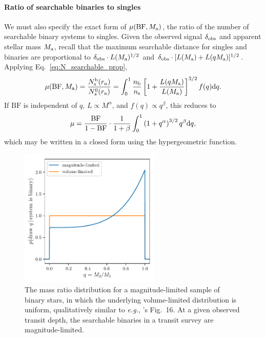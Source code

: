 \documentclass[12pt,modern]{aastex61}
\renewcommand{\a}{_{\rm a}}
\newcommand{\s}{_{\rm s}}
\begin{document}
\paragraph{Ratio of searchable binaries to singles}
We must also specify the exact form of $\mu({\rm BF},M\a)$, the ratio of 
the number of searchable binary systems to singles.
Given the observed signal $\delta_{\rm obs}$ and apparent stellar mass $M\a$, 
recall that the maximum searchable distance for singles and binaries are 
proportional to $\delta_{\rm obs}\cdot L(M\a)^{1/2}$ and $\delta_{\rm 
obs}\cdot [L(M\a)+L(qM\a)]^{1/2}$.
Applying Eq.~\ref{eq:N_searchable_prop},
\begin{equation}
\mu({\rm BF},M\a) = 
\frac{N\s^{\rm b}(r_a)}{N_s^0(r\a)}=
\int_0^1 {n_{\rm b}\over n_{\rm s}}\left[1+{L(qM\a) \over L(M\a)}\right]^{3/2} 
f(q)\mathrm{d}q.
\label{eq:mu_general}
\end{equation}
If $\mathrm{BF}$ is independent of $q$, $L \propto M^\alpha$, and $f(q) 
\propto q^\beta$, this reduces to
\begin{equation}
\mu =\frac{{\rm BF}}{1 - {\rm BF}}\cdot {1\over{1+\beta}}\int_0^1 
\left(1+q^\alpha\right)^{3/2} q^\beta\mathrm{d}q,
\label{eq:mu_power_laws}
\end{equation}
which may be written in a closed form using the hypergeometric function.

\begin{figure}[!tb]
    \centering
    \includegraphics[width=0.6\textwidth]{figures/mass_ratio_distribution.pdf}
    \caption{
        The mass ratio distribution for a magnitude-limited sample of 
        binary stars, in which the underlying volume-limited distribution is 
        uniform, qualitatively similar to {\it e.g.}, 
        \citet{raghavan_survey_2010}'s Fig.~16.
        At a given observed transit depth, the searchable binaries in a 
        transit survey are magnitude-limited.
    }
    \label{fig:q_distribn_mag_limited}
\end{figure}
\end{document}
